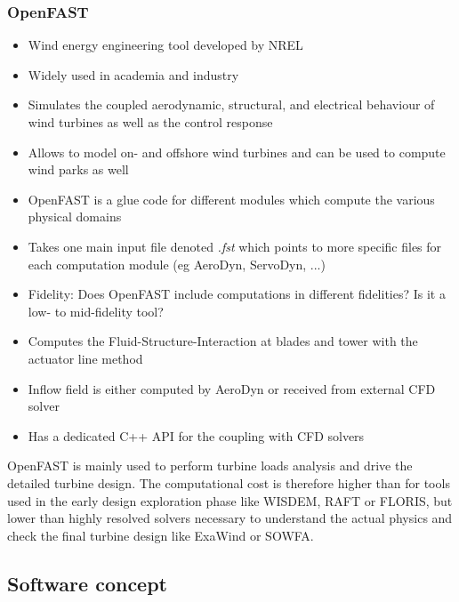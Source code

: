 \subsubsection{OpenFAST}
\begin{itemize}
	\item Wind energy engineering tool developed by NREL
	\item Widely used in academia and industry
	\item Simulates the coupled aerodynamic, structural, and electrical behaviour of wind turbines as well as the control response
	\item Allows to model on- and offshore wind turbines and can be used to compute wind parks as well
	\item OpenFAST is a glue code for different modules which compute the various physical domains
	\item Takes one main input file denoted \textit{.fst} which points to more specific files for each computation module (eg AeroDyn, ServoDyn, ...)
	\item Fidelity: Does OpenFAST include computations in different fidelities? Is it a low- to mid-fidelity tool?
	\item Computes the Fluid-Structure-Interaction at blades and tower with the actuator line method
	\item Inflow field is either computed by AeroDyn or received from external CFD solver
	\item Has a dedicated C++ API for the coupling with CFD solvers
\end{itemize}

OpenFAST is mainly used to perform turbine loads analysis and drive the detailed turbine design. The computational cost is therefore higher than for tools used in the early design exploration phase like WISDEM, RAFT or FLORIS, but lower than highly resolved solvers necessary to understand the actual physics and check the final turbine design like ExaWind or SOWFA. 

\subsection{Software concept}


